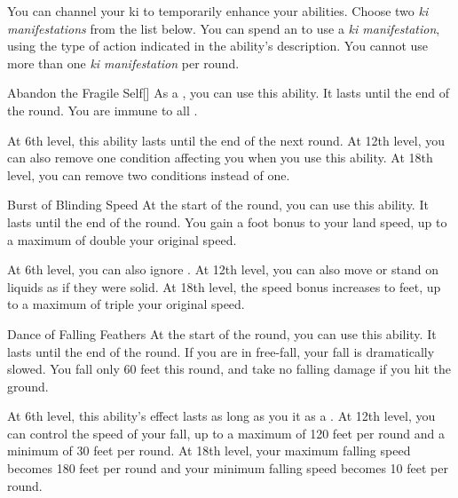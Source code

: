         You can channel your ki to temporarily enhance your abilities.
        Choose two \textit{ki manifestations} from the list below.
        You can spend an  to use a \textit{ki manifestation}, using the type of action indicated in the ability's description.
        You cannot use more than one \textit{ki manifestation} per round.
        {
            \begin{ability}{Abandon the Fragile Self}[]
                As a , you can use this ability.
                It lasts until the end of the round.
                You are immune to all .

                At 6th level, this ability lasts until the end of the next round.
                At 12th level, you can also remove one condition affecting you when you use this ability.
                At 18th level, you can remove two conditions instead of one.
            \end{ability}

            \begin{ability}{Burst of Blinding Speed}
                At the start of the round, you can use this ability.
                It lasts until the end of the round.
                You gain a  foot bonus to your land speed, up to a maximum of double your original speed.

                At 6th level, you can also ignore .
                At 12th level, you can also move or stand on liquids as if they were solid.
                At 18th level, the speed bonus increases to  feet, up to a maximum of triple your original speed.
            \end{ability}

            \begin{ability}{Dance of Falling Feathers}
                At the start of the round, you can use this ability.
                It lasts until the end of the round.
                If you are in free-fall, your fall is dramatically slowed.
                You fall only 60 feet this round, and take no falling damage if you hit the ground.

                At 6th level, this ability's effect lasts as long as you  it as a .
                At 12th level, you can control the speed of your fall, up to a maximum of 120 feet per round and a minimum of 30 feet per round.
                At 18th level, your maximum falling speed becomes 180 feet per round and your minimum falling speed becomes 10 feet per round.
            \end{ability}

}
